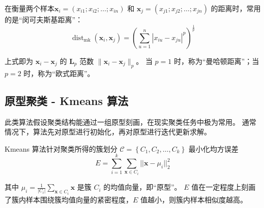 在衡量两个样本$\boldsymbol{x}_i = \left(x_{i1};x_{i2};\dots;x_{in}\right)$ 
和 $\boldsymbol{x}_j = \left(x_{j1};x_{j2};\dots;x_{jn}\right)$ 的距离时，常用的是“闵可夫斯基距离”：
\begin{equation}
    \operatorname{dist}_{\text{mk}}(\boldsymbol{x}_i, \boldsymbol{x}_j)
     = \left(\sum\limits_{u = 1}^n{|x_{iu} - x_{ju}|^p}\right)^{\frac 1p}
\end{equation}

上式即为 $\boldsymbol{x}_i - \boldsymbol{x}_j$ 的 $\boldsymbol{L}_p$ 范数 $\|\boldsymbol{x}_i - \boldsymbol{x}_j\|_p$。
当 $p = 1$ 时，称为“曼哈顿距离”；当 $p = 2$ 时，称为“欧式距离”。

\subsection{原型聚类 - Kmeans 算法}
此类算法假设聚类结构能通过一组原型刻画，在现实聚类任务中极为常用。
通常情况下，算法先对原型进行初始化，再对原型进行迭代更新求解。

Kmeans 算法针对聚类所得的簇划分 $\mathcal{C} = \left\{C_1, C_2, \dots, C_k\right\}$ 最小化均方误差
\begin{equation}
    E = \sum\limits_{i=1}^k{\sum\limits_{\boldsymbol{x} \in C_i} ||\boldsymbol{x} - \mu_i||_2^2}
\end{equation}

其中 $\mu_i = \frac 1{|C_i|}\sum_{\boldsymbol{x} \in C_i} \boldsymbol{x}$ 是簇 $C_i$ 的均值向量，即“原型”。
$E$ 值在一定程度上刻画了簇内样本围绕簇均值向量的紧密程度，$E$ 值越小，则簇内样本相似度越高。

